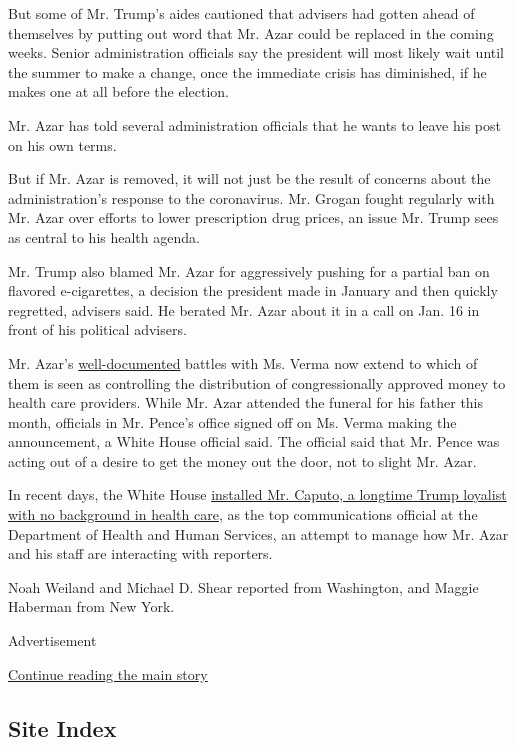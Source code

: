 But some of Mr. Trump's aides cautioned that advisers had gotten ahead
of themselves by putting out word that Mr. Azar could be replaced in the
coming weeks. Senior administration officials say the president will
most likely wait until the summer to make a change, once the immediate
crisis has diminished, if he makes one at all before the election.

Mr. Azar has told several administration officials that he wants to
leave his post on his own terms.

But if Mr. Azar is removed, it will not just be the result of concerns
about the administration's response to the coronavirus. Mr. Grogan
fought regularly with Mr. Azar over efforts to lower prescription drug
prices, an issue Mr. Trump sees as central to his health agenda.

Mr. Trump also blamed Mr. Azar for aggressively pushing for a partial
ban on flavored e-cigarettes, a decision the president made in January
and then quickly regretted, advisers said. He berated Mr. Azar about it
in a call on Jan. 16 in front of his political advisers.

Mr. Azar's
\href{https://www.politico.com/news/2019/12/11/azar-verma-trump-082816}{well-documented}
battles with Ms. Verma now extend to which of them is seen as
controlling the distribution of congressionally approved money to health
care providers. While Mr. Azar attended the funeral for his father this
month, officials in Mr. Pence's office signed off on Ms. Verma making
the announcement, a White House official said. The official said that
Mr. Pence was acting out of a desire to get the money out the door, not
to slight Mr. Azar.

In recent days, the White House
\href{https://www.nytimes.com/2020/04/16/us/politics/michael-caputo-hhs.html}{installed
Mr. Caputo, a longtime Trump loyalist with no background in health
care}, as the top communications official at the Department of Health
and Human Services, an attempt to manage how Mr. Azar and his staff are
interacting with reporters.

Noah Weiland and Michael D. Shear reported from Washington, and Maggie
Haberman from New York.

Advertisement

\protect\hyperlink{after-bottom}{Continue reading the main story}

\hypertarget{site-index}{%
\subsection{Site Index}\label{site-index}}

